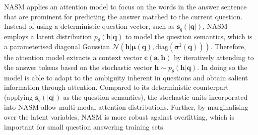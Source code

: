 \documentclass{article}
\newcommand{\tmmathbf}[1]{\ensuremath{\boldsymbol{#1}}}
\begin{document}
NASM applies an attention model to focus on the words in the answer sentence that are prominent for predicting the answer matched to the current question. 
Instead of using a deterministic question vector, such as $\tmmathbf{s}_q (| \tmmathbf{q} |)$, NASM employs a latent distribution $p_\theta (\tmmathbf{h}|\tmmathbf{q})$ to model the question semantics, which is a parameterised diagonal Gaussian $\mathcal{N}(\tmmathbf{h}|\tmmathbf{\mu}(\tmmathbf{q}),  \mathrm{diag} ( \tmmathbf{\sigma}^2 ( \tmmathbf{q})))$. 
Therefore, the attention model extracts a context vector $\tmmathbf{c}(\tmmathbf{a},\tmmathbf{h})$ by iteratively attending to the answer tokens based on the stochastic vector $\tmmathbf{h} \sim p_\theta (\tmmathbf{h}|\tmmathbf{q}) $. 
In doing so the model is able to adapt to the ambiguity inherent in questions and obtain salient information through attention. 
Compared to its deterministic counterpart (applying $\tmmathbf{s}_q (| \tmmathbf{q} |)$ as the question semantics), the stochastic units incorporated into NASM allow multi-modal attention distributions. 
Further, by marginalising over the latent variables, NASM is more robust against overfitting, which is important for small question answering training sets.
\end{document}

